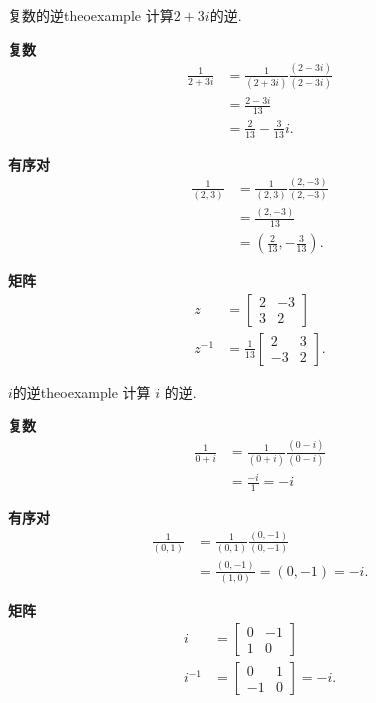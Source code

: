 \begin{myexample}{复数的逆}{theoexample}
计算$2+3 i$的逆.

\textbf{复数}
$$
  \begin{aligned}
    \frac{1}{2+3 i} & =\frac{1}{(2+3 i)} \frac{(2-3 i)}{(2-3 i)} \\
                    & =\frac{2-3 i}{13}                          \\
                    & =\frac{2}{13}-\frac{3}{13} i .
  \end{aligned}
$$

\textbf{有序对}
$$
  \begin{aligned}
    \frac{1}{(2,3)} & =\frac{1}{(2,3)} \frac{(2,-3)}{(2,-3)}     \\
                    & =\frac{(2,-3)}{13}                         \\
                    & =\left(\frac{2}{13},-\frac{3}{13}\right) .
  \end{aligned}
$$

\textbf{矩阵}
$$
  \begin{aligned}
    z      & =\left[\begin{array}{lc}
        2 & -3 \\
        3 & 2
      \end{array}\right]               \\
    z^{-1} & =\frac{1}{13}\left[\begin{array}{cc}
        2  & 3 \\
        -3 & 2
      \end{array}\right] .
  \end{aligned}
$$

\end{myexample}

\begin{myexample}{\boldmath$i$的逆}{theoexample}
计算 $i$ 的逆.

\textbf{复数}
$$
  \begin{aligned}
    \frac{1}{0+i} & =\frac{1}{(0+i)} \frac{(0-i)}{(0-i)} \\
                  & =\frac{-i}{1}=-i
  \end{aligned}
$$

\textbf{有序对}
$$
  \begin{aligned}
    \frac{1}{(0,1)} & =\frac{1}{(0,1)} \frac{(0,-1)}{(0,-1)} \\
                    & =\frac{(0,-1)}{(1,0)}=(0,-1)=-i .
  \end{aligned}
$$

\textbf{矩阵}
$$
  \begin{aligned}
    i      & =\left[\begin{array}{cc}
        0 & -1 \\
        1 & 0
      \end{array}\right]      \\
    i^{-1} & =\left[\begin{array}{cc}
        0  & 1 \\
        -1 & 0
      \end{array}\right]=-i .
  \end{aligned}
$$
\end{myexample}

